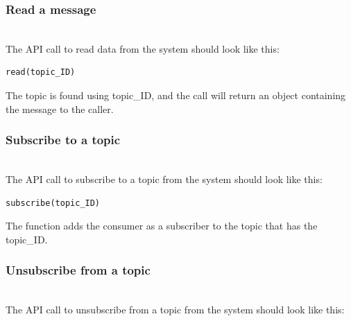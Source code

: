 \subsubsection{Read a message}\label{EuM-YLbnZmAEPU4TJT5NW}
\\
The API call to read data from the system should look like this:

\begin{verbatim}
read(topic_ID)
\end{verbatim}

The topic is found using topic\_ID, and the call will return an object containing the message to the caller.

\begin{table}[htbp]
\centering
\small
{}
\end{table}

\subsubsection{Subscribe to a topic}\label{QRN3R4iFBE5nKTapz4AAB}
\\
The API call to subscribe to a topic from the system should look like this:

\begin{verbatim}
subscribe(topic_ID)
\end{verbatim}

The function adds the consumer as a subscriber to the topic that has the topic\_ID.

\begin{table}[htbp]
\centering
\small
{}
\end{table}

\subsubsection{Unsubscribe from a topic}\label{ncOGTJOcQhSNqt0plo5ZL}
\\
The API call to unsubscribe from a topic from the system should look like this:

